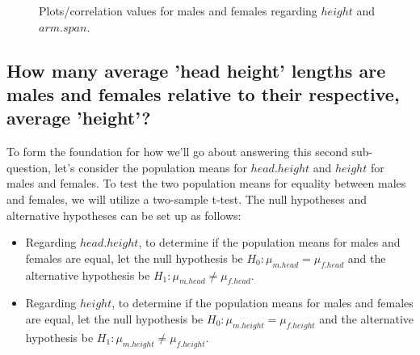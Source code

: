 \documentclass[]{article}
\begin{document}
\begin{figure}[!ht]
    \begin{center}
        \caption{Plots/correlation values for males and females regarding $height$ and $arm.span$.}
        \label{fig:sq1}
    \end{center}
\end{figure}

\subsection{How many average 'head height' lengths are males and females relative to their respective, average 'height'?}
\label{sec:rq4}

To form the foundation for how we'll go about answering this second
sub-question, let's consider the population means for \(head.height\)
and \(height\) for males and females. To test the two population means
for equality between males and females, we will utilize a two-sample
t-test. The null hypotheses and alternative hypotheses can be set up as
follows:

\begin{itemize}
\item
  Regarding \(head.height\), to determine if the population means for
  males and females are equal, let the null hypothesis be
  \(H_0: \mu_{m.head}=\mu_{f.head}\) and the alternative hypothesis be
  \(H_1: \mu_{m.head} \neq \mu_{f.head}\).
\item
  Regarding \(height\), to determine if the population means for males
  and females are equal, let the null hypothesis be
  \(H_0: \mu_{m.height}=\mu_{f.height}\) and the alternative hypothesis
  be \(H_1: \mu_{m.height} \neq \mu_{f.height}\).
\end{itemize}
\end{document}
